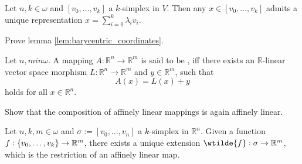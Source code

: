 \begin{lemma}
	\label{lem:barycentric_coordinates}
	Let $n,k \in \omega$ and $[v_0,\dots,v_k]$ a $k$-simplex in $V$. Then any $x \in [v_0,\dots,v_k]$ admits a unique representation $x = \sum_{i = 0}^k \lambda_i v_i$.
\end{lemma}

\begin{exercise}
	Prove lemma \ref{lem:barycentric_coordinates}.
\end{exercise}

\begin{definition}
	Let $n,m in \omega$. A mapping $A : \mathbb{R}^n \to \mathbb{R}^m$ is said to be , iff there exists an $\mathbb{R}$-linear vector space morphism $L : \mathbb{R}^n \to \mathbb{R}^m$ and $y \in \mathbb{R}^m$, such that 
	\begin{equation*}
		A(x) = L(x) + y
	\end{equation*}
	\noindent holds for all $x \in \mathbb{R}^n$.
\end{definition}

\begin{exercise}
	\label{ex:affinely_linear}
	Show that the composition of affinely linear mappings is again affinely linear.
\end{exercise}

\begin{proposition}
	\label{prop:affine_map_induced_by_vertex_map}
	Let $n,k,m \in \omega$ and $\sigma := [v_0,\dots,v_n]$ a $k$-simplex in $\mathbb{R}^n$. Given a function $f : \cbr{v_0,\dots,v_k} \to \mathbb{R}^m$, there exists a unique extension $\wtilde{f} : \sigma \to \mathbb{R}^m$, which is the restriction of an affinely linear map.
\end{proposition}

